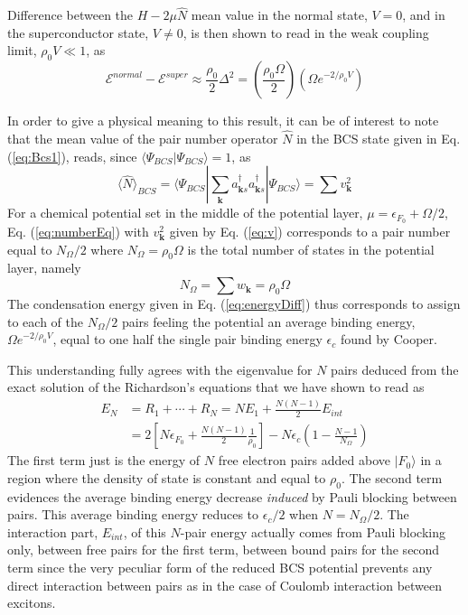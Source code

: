 \documentclass[aps,prb,preprint,groupedaddress,amsmath]{revtex4-1}
\newcommand{\vk}{\ensuremath{\mathbf{k}}}
\newcommand{\dg}{\ensuremath{\dagger}}
\begin{document}
Difference between the $H-2\mu\hat{N}$ mean value in the normal state, $V=0$, and in the superconductor state, $V\neq0$, is then shown to read in the weak coupling limit, $\rho_0V\ll1$, as
\begin{equation}\label{eq:energyDiff}
\mathcal{E}^{normal}-\mathcal{E}^{super}\approx\frac{\rho_0}{2}\Delta^2=(\frac{\rho_0\Omega}{2})(\Omega{}e^{-2/\rho_0V})
\end{equation}

In order to give a physical meaning to this result, it can be of interest to note that the  mean value of the pair number operator $\hat{N}$ in the BCS state given in Eq. (\ref{eq:Bcs1}), reads, since $\langle\Psi_{BCS}|\Psi_{BCS}\rangle=1$, as
\begin{equation}\label{eq:numberEq}
\langle{\hat{N}}{\rangle}_{BCS}={\langle\Psi_{BCS}|\sum_\vk{a^\dg_{\vk{}s}{}a^\dg_{\vk{}s}}|\Psi_{BCS}{\rangle}}
=\sum{v_\vk^2}
\end{equation}
For a chemical potential set in the middle of the potential layer,
 $\mu=\epsilon_{F_0}+\Omega/2$, Eq. (\ref{eq:numberEq}) with $v_\vk^2$ given by Eq. (\ref{eq:v}) corresponds to  a pair number  equal to $N_\Omega/2$ where $N_{\Omega}=\rho_0\Omega$ is the total number of states  in the potential layer, namely 
\begin{equation}
 N_\Omega=\sum{w_\vk}=\rho_0\Omega
\end{equation}
 The  condensation energy given in Eq. (\ref{eq:energyDiff}) thus corresponds to assign to each of the $N_\Omega/2$ pairs  feeling the potential an average binding energy, $\Omega{}e^{-2/\rho_0V}$, equal to one half the single pair binding energy $\epsilon_c$ found by Cooper. 

This understanding fully agrees with the  eigenvalue for $N$ pairs deduced from the exact solution of the Richardson's equations that we have shown to read as
\begin{equation}
\begin{split}
E_N&=R_1+\cdots+R_N=NE_1+\frac{N(N-1)}2E_{int}\\
&=2\left[N\epsilon_{F_0}+\frac{N(N-1)}2\frac{1}{\rho_0}\right]-N\epsilon_c(1-\frac{N-1}{N_\Omega})
\end{split}
\end{equation}
The first term just is the energy of $N$ free electron pairs added above $|F_0{\rangle}$ in a region where the density of state is constant and equal to $\rho_0$.  The second term evidences the average binding energy decrease \emph{induced} by Pauli blocking between pairs.    This average binding energy reduces to $\epsilon_c/2$ when $N=N_{\Omega}/2$.  The interaction part, $E_{int}$, of this $N$-pair energy actually comes from Pauli blocking only, between free pairs for the first term, between bound pairs for the second term since the very peculiar form of the reduced BCS potential prevents any direct interaction between pairs as in the case of Coulomb interaction between excitons.  
\end{document}

